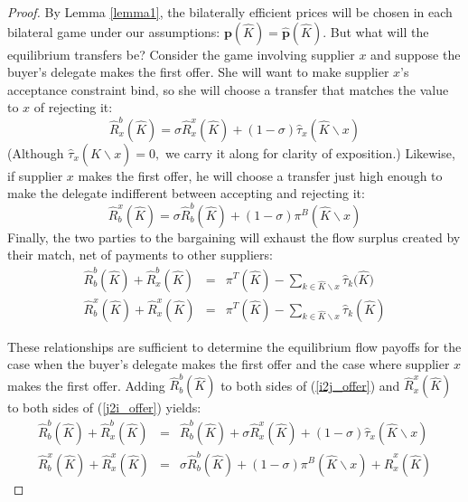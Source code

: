 \documentclass[12pt]{article} \usepackage{amsmath,amssymb,amsthm,geometry,graphicx,setspace,algorithm,algpseudocode,float}
\begin{document}
\begin{proof}
By Lemma \ref{lemma1}, the bilaterally efficient prices will be chosen in each bilateral game under our assumptions: $\mathbf{p}(\hat{K})=\mathbf{\hat{p}}(\hat{K}).$ But what will the equilibrium transfers be? Consider the game involving supplier $x$ and suppose the buyer's delegate makes the first offer. She will want to make supplier $x$'s acceptance constraint bind, so she will choose a transfer that matches the value to $x$ of rejecting it:%
\begin{equation}
\hat{R}_{x}^{b}(\hat{K})=\sigma \hat{R}_{x}^{x}(\hat{K})+(1-\sigma )\hat{\tau%
}_{x}(\hat{K}\backslash x)  \label{i2j_offer}
\end{equation}%
(Although $\hat{\tau}_{x}(\hat{K}\backslash x)=0,$ we carry it along for
clarity of exposition.) Likewise, if supplier $x$ makes the first offer, he
will choose a transfer just high enough to make the delegate indifferent
between accepting and rejecting it:
\begin{equation}
\hat{R}_{b}^{x}(\hat{K})=\sigma \hat{R}_{b}^{b}(\hat{K})+(1-\sigma )\pi ^{B}(%
\hat{K}\backslash x)  \label{j2i_offer}
\end{equation}
Finally, the two parties to the bargaining will exhaust the flow surplus created by their match, net of payments to other suppliers: 
\begin{eqnarray}
\hat{R}_{b}^{b}(\hat{K})+\hat{R}_{x}^{b}(\hat{K}) &=&{\pi^{T}(\hat{K})-\sum\limits_{k\in \hat{K}\backslash x} \hat{\tau}_{k}(\hat{K}})
\label{exhaust_surplus1} \\
\hat{R}_{b}^{x}(%
\hat{K})+\hat{R}_{x}^{x}(\hat{K})&=&{\pi^{T}(\hat{K})-\sum\limits_{k\in \hat{K}\backslash x} \hat{\tau}_{k}(\hat{K})}\label{exhaust_surplus1b}
\end{eqnarray}
\par
These relationships are sufficient to determine the equilibrium flow payoffs for the case when the buyer's delegate makes the first offer and the case where supplier $x$ makes the first offer. Adding $\hat{R}_b^b(\hat{K})$ to both sides of (\ref{i2j_offer}) and $\hat{R}_x^x(\hat{K})$ to both sides of  (\ref{j2i_offer}) yields:%
\begin{eqnarray}
\hat{R}_{b}^{b}(\hat{K})+\hat{R}_{x}^{b}(\hat{K}) &=&\hat{R}_{b}^{b}(\hat{K}%
)+\sigma \hat{R}_{x}^{x}(\hat{K})+(1-\sigma )\hat{\tau}_{x}(\hat{K}%
\backslash x)  \label{value_balance_i} \\
\hat{R}_{b}^{x}(\hat{K})+\hat{R}_{x}^{x}(\hat{K}) &=&\sigma \hat{R}_{b}^{b}(%
\hat{K})+(1-\sigma )\pi ^{B}(\hat{K}\backslash x)+\hat{R}_{x}^{x}(\hat{K})

\end{eqnarray}
\end{proof}
\end{document}
